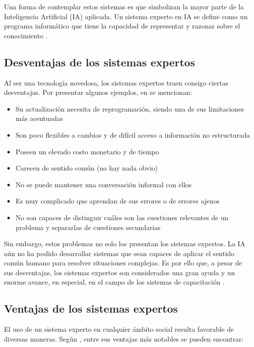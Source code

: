 Una forma de contemplar estos sistemas es que simbolizan la mayor parte de la Inteligencia Artificial (IA) aplicada. Un sistema experto en IA se define como un programa informático que tiene la capacidad de representar y razonar sobre el conocimiento \cite{Rasheed2021}.

\subsection{Desventajas de los sistemas expertos}
Al ser una tecnología novedosa, los sistemas expertos traen consigo ciertas desventajas. Por presentar algunos ejemplos, en \cite{Kandula2020} se mencionan:

\begin{itemize}
\item Su actualización necesita de reprogramación, siendo una de sus limitaciones más acentuadas
\item Son poco flexibles a cambios y de difícil acceso a información no estructurada
\item Poseen un elevado costo monetario y de tiempo
\item Carecen de sentido común (no hay nada obvio)
\item No se puede mantener una conversación informal con ellos
\item Es muy complicado que aprendan de sus errores o de errores ajenos
\item No son capaces de distinguir cuáles son las cuestiones relevantes de un
problema y separarlas de cuestiones secundarias
\end{itemize}

Sin embargo, estos problemas no solo los presentan los sistemas expertos. La IA aún no ha podido desarrollar sistemas que
sean capaces de aplicar el sentido común humano para resolver situaciones complejas. Es por ello que, a pesar de sus desventajas, los sistemas expertos son considerados una gran ayuda y un enorme avance, en especial, en el campo de los sistemas de capacitación \cite{Barham2022}.

\subsection{Ventajas de los sistemas expertos}
El uso de un sistema experto en cualquier ámbito social resulta favorable de diversas maneras. Según \cite{Mitchell1990}, entre sus ventajas más notables se pueden encontrar:

